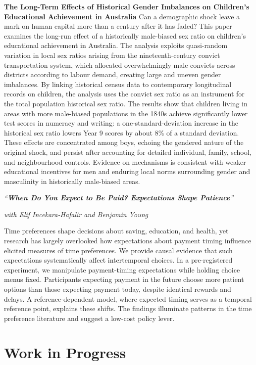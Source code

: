 \documentclass[11pt,a4paper]{article}
\newcommand{\nodate}[1]{#1\par\vspace{7pt}}
\newcommand{\paper}[3]{%
  \emph{``#1''}\par\vspace{1pt}
  \ifx\relax#2\relax\else{\small #2}\par\vspace{1pt}\fi
  {\small #3}\par}
\begin{document}
\nodate{\textbf{\paper
  {The Long-Term Effects of Historical Gender Imbalances on Children's Educational Achievement in Australia}}
  {\relax}
  {Can a demographic shock leave a mark on human capital more than a century after it has faded? This paper examines the long-run effect of a historically male-biased sex ratio on children's educational achievement in Australia. The analysis exploits quasi-random variation in local sex ratios arising from the nineteenth-century convict transportation system, which allocated overwhelmingly male convicts across districts according to labour demand, creating large and uneven gender imbalances. By linking historical census data to contemporary longitudinal records on children, the analysis uses the convict sex ratio as an instrument for the total population historical sex ratio. The results show that children living in areas with more male-biased populations in the 1840s achieve significantly lower test scores in numeracy and writing: a one-standard-deviation increase in the historical sex ratio lowers Year 9 scores by about 8\% of a standard deviation. These effects are concentrated among boys, echoing the gendered nature of the original shock, and persist after accounting for detailed individual, family, school, and neighbourhood controls. Evidence on mechanisms is consistent with weaker educational incentives for men and enduring local norms surrounding gender and masculinity in historically male-biased areas.}}

\nodate{\paper
  {\textbf{When Do You Expect to Be Paid? Expectations Shape Patience}}
  {\textit{with Elif Incekara-Hafalir and Benjamin Young}}
   {\relax}
   {Time preferences shape decisions about saving, education, and health, yet research has largely overlooked how expectations about payment timing influence elicited measures of time preferences. We provide causal evidence that such expectations systematically affect intertemporal choices. In a pre-registered experiment, we manipulate payment-timing expectations while holding choice menus fixed. Participants expecting payment in the future choose more patient options than those expecting payment today, despite identical rewards and delays. A reference-dependent model, where expected timing serves as a temporal reference point, explains these shifts. The findings illuminate patterns in the time preference literature and suggest a low-cost policy lever.}}


\section{Work in Progress}
\end{document}
